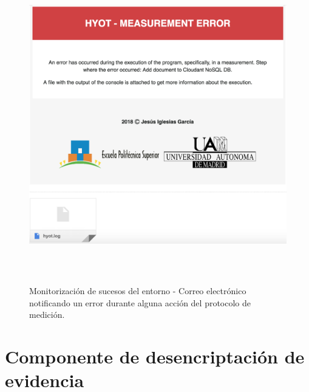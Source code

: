 \documentclass[12pt,a4paper, twoside]{report}
\begin{document}
			\begin{figure}[!ht]   
				\caption{Monitorización de sucesos del entorno - Correo electrónico notificando un error durante alguna acción del protocolo de medición.} 
				\begin{center} 
					\includegraphics[width=12cm,height=13cm]{Images/userGuide/monitoring/errorMail} \\
					\label{fig:userguide_monitoring_errorMail} 
				\end{center}  
			\end{figure}	 
	 
	 \newpage
	 
	 \section{Componente de desencriptación de evidencia}
	 	 
\end{document}
